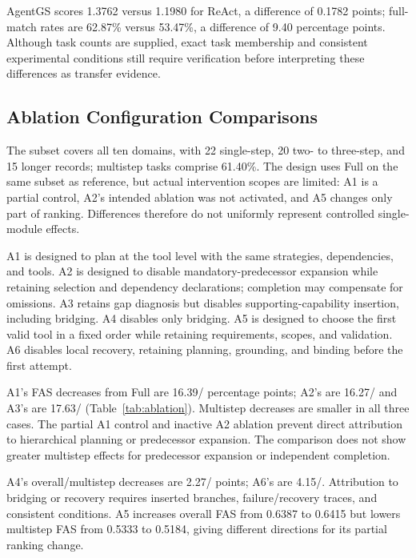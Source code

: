 AgentGS scores 1.3762 versus 1.1980 for ReAct, a difference of 0.1782 points; full-match rates are 62.87\% versus 53.47\%, a difference of 9.40 percentage points. Although task counts are supplied, exact task membership and consistent experimental conditions still require verification before interpreting these differences as transfer evidence.

\subsection{Ablation Configuration Comparisons}
\label{sec:ablations}
The subset covers all ten domains, with 22 single-step, 20 two- to three-step, and 15 longer records; multistep tasks comprise 61.40\%. The design uses Full on the same subset as reference, but actual intervention scopes are limited: A1 is a partial control, A2's intended ablation was not activated, and A5 changes only part of ranking. Differences therefore do not uniformly represent controlled single-module effects.

A1 is designed to plan at the tool level with the same strategies, dependencies, and tools. A2 is designed to disable mandatory-predecessor expansion while retaining selection and dependency declarations; completion may compensate for omissions. A3 retains gap diagnosis but disables supporting-capability insertion, including bridging. A4 disables only bridging. A5 is designed to choose the first valid tool in a fixed order while retaining requirements, scopes, and validation. A6 disables local recovery, retaining planning, grounding, and binding before the first attempt.



A1's FAS decreases from Full are 16.39/ percentage points; A2's are 16.27/ and A3's are 17.63/ (Table~\ref{tab:ablation}). Multistep decreases are smaller in all three cases. The partial A1 control and inactive A2 ablation prevent direct attribution to hierarchical planning or predecessor expansion. The comparison does not show greater multistep effects for predecessor expansion or independent completion.

A4's overall/multistep decreases are 2.27/ points; A6's are 4.15/. Attribution to bridging or recovery requires inserted branches, failure/recovery traces, and consistent conditions. A5 increases overall FAS from 0.6387 to 0.6415 but lowers multistep FAS from 0.5333 to 0.5184, giving different directions for its partial ranking change.


